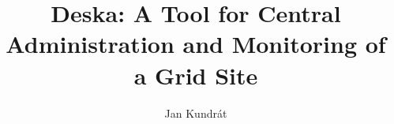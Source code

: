 \documentclass{book}
\begin{document}
\title{Deska: A Tool for Central Administration and Monitoring of a Grid Site}

\author{Jan Kundrát}

\maketitle




%
\end{document}
